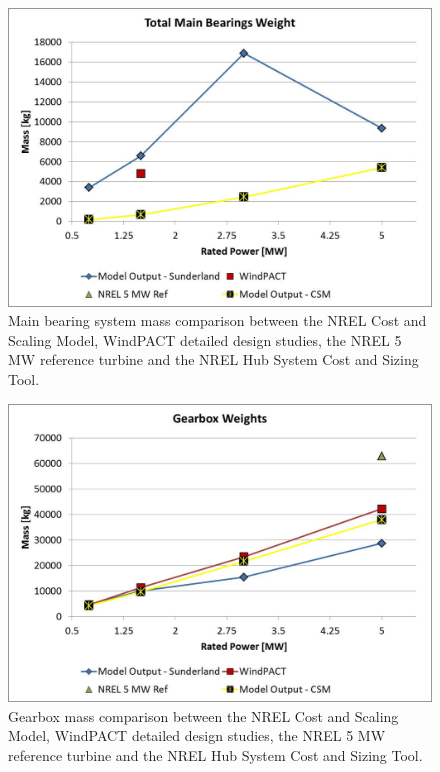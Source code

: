 \documentclass[letterpaper,10pt,openany,oneside]{sphinxmanual}
\begin{document}
\begin{figure}[htbp]
\centering
\capstart

\includegraphics[width=6.5in]{bearingsmass.pdf}
\caption{Main bearing system mass comparison between the NREL Cost and Scaling Model, WindPACT detailed design studies, the NREL 5 MW reference turbine and the NREL Hub System Cost and Sizing Tool.}\label{theory:bearingsmass}\end{figure}
\begin{figure}[htbp]
\centering
\capstart

\includegraphics[width=6.5in]{gearboxmass.pdf}
\caption{Gearbox mass comparison between the NREL Cost and Scaling Model, WindPACT detailed design studies, the NREL 5 MW reference turbine and the NREL Hub System Cost and Sizing Tool.}\label{theory:gearboxmass}\end{figure}
\end{document}
